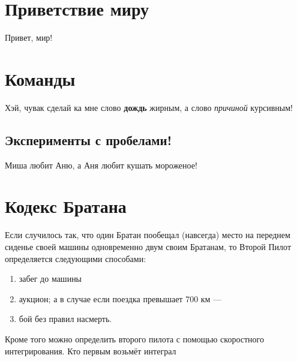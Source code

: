 \documentclass[12pt, a4paper]{article}  %
\begin{document}




\section{Приветствие миру}

Привет, мир! 

\section{Команды}

Хэй, чувак сделай ка мне слово \textbf{дождь} жирным, а слово \textit{причиной} курсивным!

\subsection{Эксперименты с пробелами!}

Миша любит          Аню, а Аня любит         кушать мороженое! 


\section*{Кодекс Братана} 

Если случилось так, что один Братан пообещал (навсегда) место на переднем сиденье своей машины одновременно двум своим Братанам, то Второй Пилот определяется следующими способами:


\begin{enumerate}
\item забег до машины
\item аукцион; а в случае если поездка превышает 700 км ---
\item бой без правил насмерть.  %
\end{enumerate}






Кроме того можно определить второго пилота с помощью скоростного интегрирования. Кто первым возьмёт интеграл 
\end{document}
